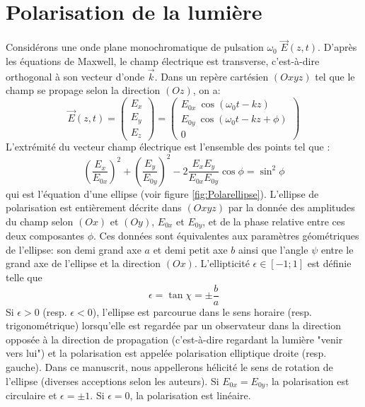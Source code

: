 \section{Polarisation de la lumière}
Considérons une onde plane monochromatique de pulsation $\omega_0$ $\vec{E}(z,t)$. D'après les équations de Maxwell, le champ électrique est transverse, c'est-à-dire orthogonal à son vecteur d'onde $\vec{k}$. Dans un repère cartésien $(Oxyz)$ tel que le champ se propage selon la direction $(Oz)$, on a:
\begin{equation}
\vec{E}(z,t) = \begin{pmatrix}
E_x \\
E_y\\
E_z
\end{pmatrix} =
\begin{pmatrix}
E_{0x} \: \cos(\omega_0 t - k z) \\
E_{0y} \: \cos(\omega_0 t - k z + \phi)  \\
0
\end{pmatrix}
\end{equation}
L'extrémité du vecteur champ électrique est l'ensemble des points tel que : 
\begin{equation}
\left(\frac{E_x}{E_{0x}}\right)^2 + \left(\frac{E_y}{E_{0y}}\right)^2 - 2 \frac{E_x E_y}{E_{0x} E_{0y}} \cos \phi = \sin^2 \phi
\end{equation}
qui est l'équation d'une ellipse (voir figure \ref{fig:Polarellipse}). L'ellipse de polarisation est entièrement décrite dans $(Oxyz)$ par la donnée des amplitudes du champ selon $(Ox)$ et $(Oy)$, $E_{0x}$ et $E_{0y}$, et de la phase relative entre ces deux composantes $\phi$. Ces données sont équivalentes aux paramètres géométriques de l'ellipse: son demi grand axe $a$ et demi petit axe $b$ ainsi que l'angle $\psi$ entre le grand axe de l'ellipse et la direction $(Ox)$. L'ellipticité $\epsilon \in [-1; 1]$ est définie telle que 
\begin{equation}
\epsilon = \tan \chi = \pm \frac{b}{a}
\end{equation}
Si $\epsilon > 0$ (resp. $\epsilon <0$), l'ellipse est parcourue dans le sens horaire (resp. trigonométrique) lorsqu'elle est regardée par un observateur dans la direction opposée à la direction de propagation (c'est-à-dire regardant la lumière "venir vers lui") et la polarisation est appelée polarisation elliptique droite (resp. gauche). Dans ce manuscrit, nous appellerons hélicité le sens de rotation de l'ellipse (diverses acceptions selon les auteurs). Si $E_{0x} = E_{0y}$, la polarisation est circulaire et $\epsilon = \pm 1$. Si $\epsilon = 0$, la polarisation est linéaire.

